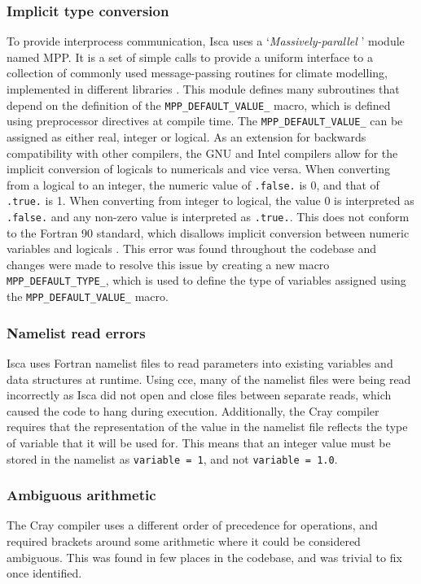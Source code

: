 \documentclass[a4paper,11pt]{report}
\begin{document}
\subsubsection{Implicit type conversion}
To provide interprocess communication, Isca uses a `\textit{Massively-parallel} ' module named MPP. It is a set of simple calls to provide a uniform interface to a collection of commonly used message-passing routines for climate modelling, implemented in different libraries \cite{balaji2002fms}. This module defines many subroutines that depend on the definition of the \texttt{MPP\_DEFAULT\_VALUE\_} macro, which is defined using preprocessor directives at compile time. The \texttt{MPP\_DEFAULT\_VALUE\_} can be assigned as either real, integer or logical. As an extension for backwards compatibility with other compilers, the GNU and Intel compilers allow for the implicit conversion of logicals to numericals and vice versa. When converting from a logical to an integer, the numeric value of \texttt{.false.} is 0, and that of \texttt{.true.} is 1. When converting from integer to logical, the value 0 is interpreted as \texttt{.false.} and any non-zero value is interpreted as \texttt{.true.}. This does not conform to the Fortran 90 standard, which disallows implicit conversion between numeric variables and logicals \cite{fortran1991standard,gnu2019conversion}. This error was found throughout the codebase and changes were made to resolve this issue by creating a new macro \texttt{MPP\_DEFAULT\_TYPE\_}, which is used to define the type of variables assigned using the \texttt{MPP\_DEFAULT\_VALUE\_} macro.

\subsubsection{Namelist read errors}
Isca uses Fortran namelist files to read parameters into existing variables and data structures at runtime. Using \gls{cce}, many of the namelist files were being read incorrectly as Isca did not open and close files between separate reads, which caused the code to hang during execution. Additionally, the Cray compiler requires that the representation of the value in the namelist file reflects the type of variable that it will be used for. This means that an integer value must be stored in the namelist as \texttt{variable = 1}, and not \texttt{variable = 1.0}.

\subsubsection{Ambiguous arithmetic}
The Cray compiler uses a different order of precedence for operations, and required brackets around some arithmetic where it could be considered ambiguous. This was found in few places in the codebase, and was trivial to fix once identified. 
\end{document}
